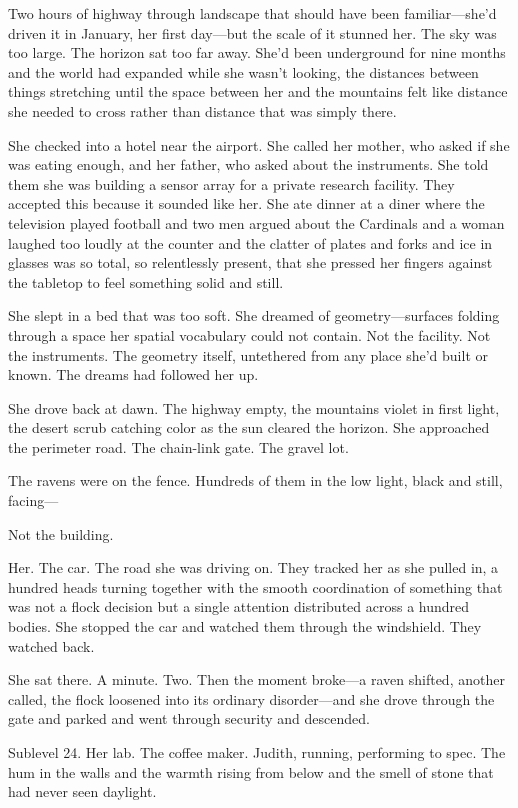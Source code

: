 Two hours of highway through landscape that should have been familiar---she'd driven it in January, her first day---but the scale of it stunned her. The sky was too large. The horizon sat too far away. She'd been underground for nine months and the world had expanded while she wasn't looking, the distances between things stretching until the space between her and the mountains felt like distance she needed to cross rather than distance that was simply there.

She checked into a hotel near the airport. She called her mother, who asked if she was eating enough, and her father, who asked about the instruments. She told them she was building a sensor array for a private research facility. They accepted this because it sounded like her. She ate dinner at a diner where the television played football and two men argued about the Cardinals and a woman laughed too loudly at the counter and the clatter of plates and forks and ice in glasses was so total, so relentlessly present, that she pressed her fingers against the tabletop to feel something solid and still.

She slept in a bed that was too soft. She dreamed of geometry---surfaces folding through a space her spatial vocabulary could not contain. Not the facility. Not the instruments. The geometry itself, untethered from any place she'd built or known. The dreams had followed her up.

She drove back at dawn. The highway empty, the mountains violet in first light, the desert scrub catching color as the sun cleared the horizon. She approached the perimeter road. The chain-link gate. The gravel lot.

The ravens were on the fence. Hundreds of them in the low light, black and still, facing---

Not the building.

Her. The car. The road she was driving on. They tracked her as she pulled in, a hundred heads turning together with the smooth coordination of something that was not a flock decision but a single attention distributed across a hundred bodies. She stopped the car and watched them through the windshield. They watched back.

She sat there. A minute. Two. Then the moment broke---a raven shifted, another called, the flock loosened into its ordinary disorder---and she drove through the gate and parked and went through security and descended.

Sublevel 24. Her lab. The coffee maker. Judith, running, performing to spec. The hum in the walls and the warmth rising from below and the smell of stone that had never seen daylight.

